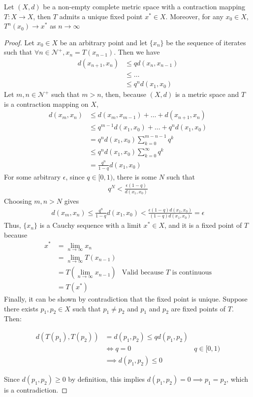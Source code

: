 \documentclass{article}
\begin{document}
\begin{thm} \label{thm:banach}
Let $(X, d)$ be a non-empty complete metric space with a contraction mapping $T : X \to X$, then $T$ admits a unique fixed point $x^* \in X$.
Moreover, for any $x_0 \in X$, $T^n(x_0) \to x^*$ as $n\to\infty$
\end{thm}

\begin{proof}
Let $x_0 \in X$ be an arbitrary point and let $\{x_n\}$ be the sequence of iterates such that $\forall n \in \mathcal{N}^+, x_n = T(x_{n-1})$. Then we have
\begin{align*}
    d(x_{n+1}, x_n) &\leq q d(x_n, x_{n-1})\\
    &\leq \ldots\\
    &\leq q^n d(x_1, x_0)
\end{align*}
Let $m, n \in \mathcal{N}^+$ such that $m > n$, then, because $(X, d)$ is a metric space and $T$ is a contraction mapping on $X$,
\begin{align*}
    d(x_m, x_n) &\leq d(x_m, x_{m-1}) + \ldots + d(x_{n+1}, x_n)\\
    &\leq q^{m-1}d(x_1, x_0) + \ldots + q^{n}d(x_1, x_0)\\
    &= q^n d(x_1, x_0) \sum_{k=0}^{m-n-1}q^k\\
    &\leq q^n d(x_1, x_0) \sum_{k=0}^{\infty}q^k\\
    &= \frac{q^n}{1 - q} d(x_1, x_0)
\end{align*}
For some arbitrary $\epsilon$, since $q \in [0, 1)$, there is some $N$ such that
\begin{align*}
    q^N < \frac{\epsilon (1-q)}{d(x_1, x_0)}
\end{align*}
Choosing $m, n > N$ gives
\begin{align*}
    d(x_m, x_n) \leq \frac{q^n}{1 - q} d(x_1, x_0) < \frac{\epsilon (1 - q) d(x_1, x_0)}{(1 - q) d(x_1, x_0)} = \epsilon
\end{align*}
Thus, $\{x_n\}$ is a Cauchy sequence with a limit $x^* \in X$, and it is a fixed point of $T$ because
\begin{align*}
    x^* &= \lim_{n\to\infty} x_n\\
    &= \lim_{n\to\infty} T(x_{n-1})\\
    &= T(\lim_{n\to\infty} x_{n-1}) &\text{Valid because $T$ is continuous}\\
    &= T(x^*)
\end{align*}
Finally, it can be shown by contradiction that the fixed point is unique. Suppose there exists $p_1, p_2 \in X$ such that $p_1 \ne p_2$ and $p_1$ and $p_2$ are fixed points of $T$. Then:

\begin{align*}
d(T(p_1), T(p_2)) &= d(p_1, p_2) \leq qd(p_1, p_2)\\
&\iff q = 0 &\text{$q \in [0, 1)$}\\
&\implies d(p_1, p_2) \leq 0 
\end{align*}

Since $d(p_1, p_2) \geq 0$ by definition, this implies $d(p_1, p_2) = 0 \implies p_1 = p_2$, which is a contradiction. \qedhere
\end{proof}
\end{document}
